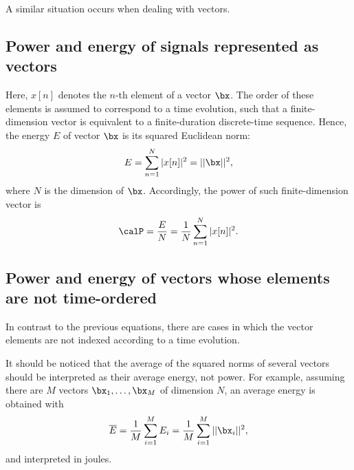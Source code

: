 
A similar situation occurs when dealing with vectors.

\subsection{Power and energy of signals represented as vectors}

Here, $x[n]$ denotes the $n$-th element of a vector $\bx$. The order of these
 elements is assumed to correspond to a time evolution, such that a finite-dimension vector is
equivalent to a finite-duration discrete-time sequence.
Hence, the energy $E$ of vector $\bx$ is its squared Euclidean norm:
\begin{equation}
E=\sum_{n=1}^N |x[n]|^2=||\bx||^2,
\label{eq:vector_energy}
\end{equation} 
where $N$ is the dimension of $\bx$. Accordingly, the power of such finite-dimension vector is
\begin{equation}
\calP = \frac{E}{N} = \frac{1}{N}\sum_{n=1}^N |x[n]|^2.
\label{eq:vector_power}
\end{equation}

\subsection{{\akadvanced} Power and energy of vectors whose elements are not time-ordered}

In contrast to the previous equations, there are cases in which the vector elements are
not indexed according to a time evolution.

It should be noticed that the average of the squared norms of several vectors should be interpreted as their average energy, not power. For example, assuming there are $M$ vectors $\bx_1,\ldots,\bx_M$ of dimension $N$, an average energy is obtained with
\begin{equation}
\overline E = \frac{1}{M} \sum_{i=1}^M E_i = \frac{1}{M} \sum_{i=1}^M ||\bx_i||^2,
\label{eq:vectors_average_energy}
\end{equation}
and interpreted in joules. 

